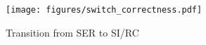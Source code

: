 

\begin{figure}[t]
    \centering
    \texttt{[image: figures/switch\_correctness.pdf]}
    \vspace{-4mm}
    \caption{Transition from SER to SI/RC}
    \label{fig:switch_correctness}
    \vspace{-4mm}
\end{figure}

